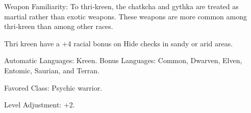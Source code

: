 \begin{itemize*}
    \item Weapon Familiarity: To thri‐kreen, the chatkcha and gythka are treated as martial rather than exotic weapons. These weapons are more common among thri‐kreen than among other races.
    \item Thri kreen have a +4 racial bonus on Hide checks in sandy or arid areas.
    \item Automatic Languages: Kreen. Bonus Languages: Common, Dwarven, Elven, Entomic, Saurian, and Terran.
    \item Favored Class: Psychic warrior.
    \item Level Adjustment: +2.
\end{itemize*}
